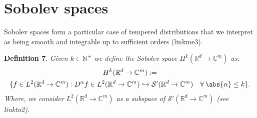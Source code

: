 \documentclass[
]{article}
\begin{document}
\hypertarget{sobolev-spaces}{%
	\section{Sobolev spaces}\label{sobolev-spaces}}

Sobolev spaces form a particular case of tempered distributions that we
interpret as being smooth and integrable up to sufficient orders
(linkme3).

\leavevmode{}%
\textbf{Definition 7}. \emph{Given \(k\in\mathbb{N}^+\) we define the
	\emph{Sobolev space} \(H^k({\mathbb R}^d\to\mathbb{C}^m)\) as:
	\[\begin{gathered}
			H^k({\mathbb R}^d\to\mathbb{C}^m):=\\ \lbrace f\in L^2({\mathbb R}^d\to\mathbb{C}^m): D^\alpha f\in L^2({\mathbb R}^d\to\mathbb{C}^m)\hookrightarrow{\mathcal S}'({\mathbb R}^d\to\mathbb{C}^m)\quad\forall\hspace{2pt}\abs{\alpha}\leq k\rbrace.
		\end{gathered}\] Where, we consider
	\(L^2({\mathbb R}^d\to\mathbb{C}^m)\) as a subspace of
	\({\mathcal S}'({\mathbb R}^d\to\mathbb{C}^m)\) (see linkto2).}
\end{document}
